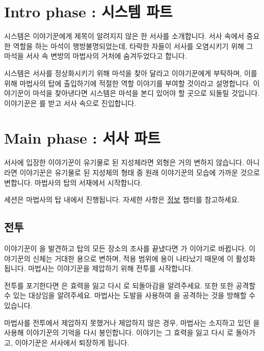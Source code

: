 \documentclass{report}
\begin{document}
	\section{Intro phase : 시스템 파트}
	
	시스템은 이야기꾼에게 제목이 알려지지 않은 한 서사를 소개합니다. 서사 속에서 중요한 역할을 하는 마석이 행방불명되었는데, 타락한 자들이 서사를 오염시키기 위해 그 마석을 서사 속 변방의 마법사의 거처에 숨겨두었다고 합니다.
	
	시스템은 서사를 정상화시키기 위해 마석을 찾아 달라고 이야기꾼에게 부탁하며, 이를 위해 마법사의 탑에 출입하기에 적절한 역할 이야기를 부여할 것이라고 설명합니다. 이야기꾼이 마석을 찾아낸다면 시스템은 마석을 본디 있어야 할 곳으로 되돌릴 것입니다. 이야기꾼은 를 받고 서사 속으로 진입합니다.
	
	
	
	
	\section{Main phase : 서사 파트}
	
	서사에 입장한 이야기꾼이 유기물로 된 지성체라면 외형은 거의 변하지 않습니다. 아니라면 이야기꾼은 유기물로 된 지성체의 형태 중 원래 이야기꾼의 모습에 가까운 것으로 변합니다. 마법사의 탑의 서재에서 시작합니다.
	
	세션은 마법사의 탑 내에서 진행됩니다. 자세한 사항은 \hyperlink{tower:information}{정보} 챕터를 참고하세요.
	
	
	
	\subsection{전투}
	
	이야기꾼이 을 발견하고 탑의 모든 장소의 조사를 끝냈다면 가 이야기로 바뀝니다. 이야기꾼의 신체는 거대한 용으로 변하며, 적용 범위에 용이 나타났기 때문에 이 활성화됩니다. 마법사는 이야기꾼을 제압하기 위해 전투를 시작합니다.
	
	전투를 포기한다면 은 효력을 잃고 다시 로 되돌아감을 알려주세요. 또한 또한 공격할 수 있는 대상임을 알려주세요. 마법사는 도발을 사용하여 을 공격하는 것을 방해할 수 있습니다.
	
	마법사를 전투에서 제압하지 못했거나 제압하지 않은 경우, 마법사는 소지하고 있던 을 사용해 이야기꾼의 기억을 다시 봉인합니다.  이야기는 그 효력을 잃고 다시 로 돌아가고, 이야기꾼은 서사에서 퇴장하게 됩니다.
	
\end{document}
